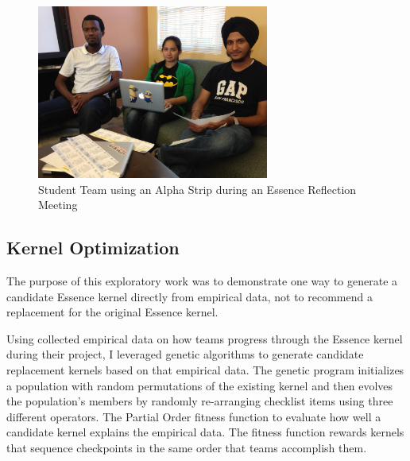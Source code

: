 \documentclass[preprint,12pt,3p]{elsarticle}
\begin{document}
\begin{figure}[ht]
\centering
\includegraphics[width=3.00in]{student_photos/team_1}
\caption{Student Team using an Alpha Strip during an Essence Reflection Meeting}
\label{AlphaStrip}
\end{figure}


\subsection{Kernel Optimization}
\label{KernelOptimization}
The purpose of this exploratory work was to demonstrate one way to generate a candidate Essence kernel directly from empirical data, not to recommend a replacement for the original Essence kernel. 

\cite{SCSE2015} 

Using collected empirical data on how teams progress through the Essence kernel during their project,
I leveraged genetic algorithms to generate candidate replacement kernels based on that empirical data. 
The genetic program initializes a population with random permutations of the existing kernel and then evolves the population's members by randomly re-arranging checklist items using three different operators. The Partial Order fitness function to evaluate how well a candidate kernel explains the empirical data. The fitness function rewards kernels that sequence checkpoints in the same order that teams accomplish them. 
\end{document}
